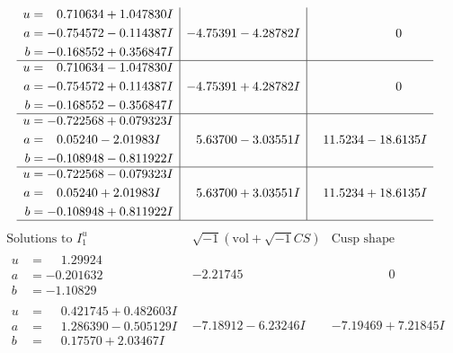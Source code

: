 \documentclass[1p]{elsarticle_modified}
\theoremstyle{definition}
\newcommand{\I}{\sqrt{-1}}
\begin{document}
$$\begin{array}{c|c|c}
\begin{aligned}
u &= \phantom{-}0.710634 + 1.047830 I \\
a &= -0.754572 - 0.114387 I \\
b &= -0.168552 + 0.356847 I\end{aligned}
 & -4.75391 - 4.28782 I & \phantom{-0.000000 } 0 \\ \hline\begin{aligned}
u &= \phantom{-}0.710634 - 1.047830 I \\
a &= -0.754572 + 0.114387 I \\
b &= -0.168552 - 0.356847 I\end{aligned}
 & -4.75391 + 4.28782 I & \phantom{-0.000000 } 0 \\ \hline\begin{aligned}
u &= -0.722568 + 0.079323 I \\
a &= \phantom{-}0.05240 - 2.01983 I \\
b &= -0.108948 - 0.811922 I\end{aligned}
 & \phantom{-}5.63700 - 3.03551 I & \phantom{-}11.5234 - 18.6135 I \\ \hline\begin{aligned}
u &= -0.722568 - 0.079323 I \\
a &= \phantom{-}0.05240 + 2.01983 I \\
b &= -0.108948 + 0.811922 I\end{aligned}
 & \phantom{-}5.63700 + 3.03551 I & \phantom{-}11.5234 + 18.6135 I\\
 \hline 
 \end{array}$$\newpage$$\begin{array}{c|c|c}  
\text{Solutions to }I^u_{1}& \I (\text{vol} + \sqrt{-1}CS) & \text{Cusp shape}\\
 \hline 
\begin{aligned}
u &= \phantom{-}1.29924\phantom{ +0.000000I} \\
a &= -0.201632\phantom{ +0.000000I} \\
b &= -1.10829\phantom{ +0.000000I}\end{aligned}
 & -2.21745\phantom{ +0.000000I} & \phantom{-0.000000 } 0 \\ \hline\begin{aligned}
u &= \phantom{-}0.421745 + 0.482603 I \\
a &= \phantom{-}1.286390 - 0.505129 I \\
b &= \phantom{-}0.17570 + 2.03467 I\end{aligned}
 & -7.18912 - 6.23246 I & -7.19469 + 7.21845 I \\ \hline\begin{aligned}

\end{aligned}
\end{array}$$
\end{document}

